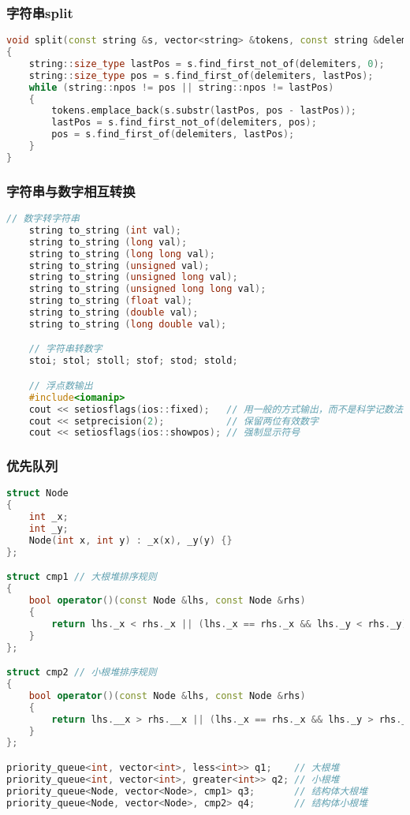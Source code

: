\documentclass[UTF8]{ctexart}
\begin{document}
\subsubsection*{字符串split}
\begin{lstlisting}[language=C++]
void split(const string &s, vector<string> &tokens, const string &delemiters = " ")
{
    string::size_type lastPos = s.find_first_not_of(delemiters, 0);
    string::size_type pos = s.find_first_of(delemiters, lastPos);
    while (string::npos != pos || string::npos != lastPos)
    {
        tokens.emplace_back(s.substr(lastPos, pos - lastPos));
        lastPos = s.find_first_not_of(delemiters, pos);
        pos = s.find_first_of(delemiters, lastPos);
    }
}    
\end{lstlisting}

\subsubsection*{字符串与数字相互转换}
\begin{lstlisting}[language=C++]
    // 数字转字符串
    string to_string (int val);
    string to_string (long val);
    string to_string (long long val);
    string to_string (unsigned val);
    string to_string (unsigned long val);
    string to_string (unsigned long long val);
    string to_string (float val);
    string to_string (double val);
    string to_string (long double val);

    // 字符串转数字
    stoi; stol; stoll; stof; stod; stold;

    // 浮点数输出
    #include<iomanip>
    cout << setiosflags(ios::fixed);   // 用一般的方式输出，而不是科学记数法
    cout << setprecision(2);           // 保留两位有效数字
    cout << setiosflags(ios::showpos); // 强制显示符号
\end{lstlisting}

\clearpage
\subsubsection*{优先队列}
\begin{lstlisting}[language=C++]
struct Node
{
    int _x;
    int _y;
    Node(int x, int y) : _x(x), _y(y) {}
};

struct cmp1 // 大根堆排序规则
{
    bool operator()(const Node &lhs, const Node &rhs)
    {
        return lhs._x < rhs._x || (lhs._x == rhs._x && lhs._y < rhs._y);
    }
};

struct cmp2 // 小根堆排序规则
{
    bool operator()(const Node &lhs, const Node &rhs)
    {
        return lhs.__x > rhs.__x || (lhs._x == rhs._x && lhs._y > rhs._y);
    }
};

priority_queue<int, vector<int>, less<int>> q1;    // 大根堆
priority_queue<int, vector<int>, greater<int>> q2; // 小根堆
priority_queue<Node, vector<Node>, cmp1> q3;       // 结构体大根堆
priority_queue<Node, vector<Node>, cmp2> q4;       // 结构体小根堆
\end{lstlisting}
\end{document}
